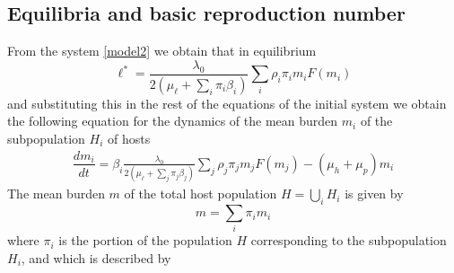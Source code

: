 \documentclass[12pt,a4paper]{article}
\theoremstyle{plain}%
\theoremstyle{definition}
\theoremstyle{remark}
\begin{document}
\subsection{Equilibria and basic reproduction number} 
From the system \eqref{model2} we obtain that in equilibrium
\begin{equation}
	\ell^*=\frac{  \lambda_0}{2 (\mu_{\ell}+\sum_i \pi_i \beta_i  )}   \sum_i \rho_{i} \pi_{i} m_{i} F(m_{i}) 
\end{equation} 
and substituting this in the rest of the equations of the initial system we obtain the following equation for the dynamics of the mean burden $m_{i}$ of the subpopulation $H_{i}$ of hosts
\begin{equation}
	\begin{split}
		\dfrac{dm_{i}}{dt}=\beta_{i} \frac{\lambda_0}{2 (\mu_{\ell}+\sum_j \pi_j \beta_j  ) }  
		\sum_j   \rho_{j} \pi_{j} m_{j} F(m_{j})  - (\mu_h+\mu_p) m_{i}%
	\end{split}
\end{equation}
The mean burden $m$ of the total host population $H=\bigcup_i H_i$ is given by
\begin{equation}
	m=\sum_i \pi_i m_{i} 
\end{equation}
where $\pi_i$ is the portion of the population $H$ corresponding to the subpopulation $H_i$, and which is described by
\end{document}
